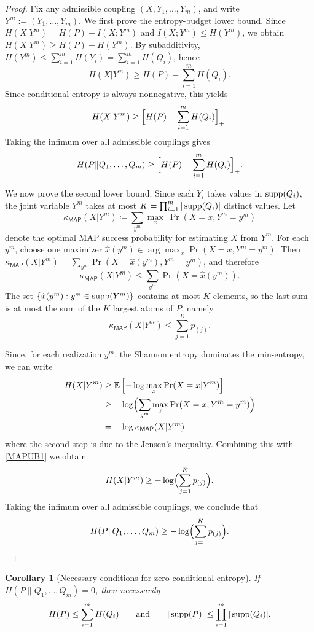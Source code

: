 \documentclass[journal]{IEEEtran}
\newtheorem{corollary}{Corollary}
\def\bE{{\mathbb E}}
\def\supp{\mathop{\rm supp}}
\newcommand{\1}{\mathbf{1}}
\begin{document}
\begin{proof}
Fix any admissible coupling $(X,Y_1,\dots,Y_m)$, and write $Y^m:=(Y_1,\dots,Y_m)$.
We first prove the entropy-budget lower bound. Since $H(X| Y^m)=H(P)-I(X;Y^m)$ and $I(X;Y^m)\le H(Y^m)$, we obtain
$H(X| Y^m)\ge H(P)-H(Y^m)$. By subadditivity,
$H(Y^m)\le \sum_{i=1}^m H(Y_i)=\sum_{i=1}^m H(Q_i)$, hence
\[
H(X| Y^m)\ge H(P)-\sum_{i=1}^m H(Q_i).
\]
Since conditional entropy is always nonnegative, this yields
\[
H(X| Y^m)\ge \Bigl[H(P)-\sum_{i=1}^m H(Q_i)\Bigr]_+.
\]
Taking the infimum over all admissible couplings gives
\[
H(P\|Q_1,\dots,Q_m)\ge \Bigl[H(P)-\sum_{i=1}^m H(Q_i)\Bigr]_+.
\]

We now prove the second lower bound. Since each $Y_i$ takes values in $\supp(Q_i)$, the joint variable $Y^m$ takes at most $K=\prod_{i=1}^m |\supp(Q_i)|$ distinct values. Let
\[
\kappa_{\mathsf{MAP}}(X| Y^m)\coloneqq 
\sum_{y^m} \max_x ~\Pr(X=x,Y^m=y^m)
\]
denote the optimal MAP success probability for estimating $X$ from $Y^m$. For each $y^m$, choose one maximizer $\hat x(y^m)\in\arg\max_x \Pr(X=x,Y^m=y^m)$. Then
$\kappa_{\mathsf{MAP}}(X| Y^m)=\sum_{y^m}\Pr(X=\hat x(y^m),Y^m=y^m)$, and therefore
\[
\kappa_{\mathsf{MAP}}(X| Y^m)\le \sum_{y^m}\Pr(X=\hat x(y^m)).
\]
The set $\{\hat x(y^m):y^m\in\supp(Y^m)\}$ contains at most $K$ elements, so the last sum is at most the sum of the $K$ largest atoms of $P$, namely
\begin{equation}\label{MAPUB1}
    \kappa_{\mathsf{MAP}}(X| Y^m)\le \sum_{j=1}^{K} p_{(j)}.
\end{equation}


Since, for each realization $y^m$, the Shannon entropy dominates the min-entropy, we can write 
\begin{align*}
    H(X| Y^m)&\ge \bE\left[-\log \max_x \Pr(X=x| Y^m)\right]\\
    & \ge -\log\Bigl(\sum_{y^m}\max_x \Pr(X=x,Y^m=y^m)\Bigr)\\
    & = -\log \kappa_{\mathsf{MAP}}(X| Y^m)\\
\end{align*}
where the second step is due to the Jensen's inequality. Combining this with \eqref{MAPUB1}  we obtain
\[
H(X| Y^m)\ge -\log\Bigl(\sum_{j=1}^{K} p_{(j)}\Bigr).
\]
Taking the infimum over all admissible couplings, we conclude that
\[
H(P\|Q_1,\dots,Q_m)\ge -\log\Bigl(\sum_{j=1}^{K} p_{(j)}\Bigr).
\]
\end{proof}

\begin{corollary}[Necessary conditions for zero conditional entropy]\label{cor:necessary-zero}
If $H(P\|Q_1,\dots,Q_m)=0$, then necessarily
\[
H(P)\le \sum_{i=1}^m H(Q_i)
\qquad\text{and}\qquad
|\supp(P)|\le \prod_{i=1}^m |\supp(Q_i)|.
\]
\end{corollary}
\end{document}
